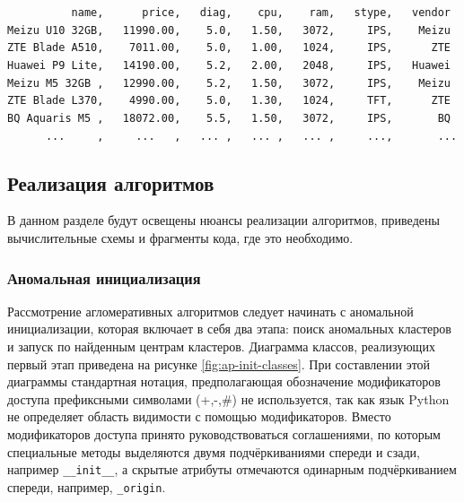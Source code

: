 \documentclass[12pt]{diploma}
\begin{document}
	\begin{tcolorbox}[colframe=black!50!black,coltext=black!25!black,colback=white,title=\textbf{Пример файла входных данных}]
		\verb|          name,      price,   diag,    cpu,    ram,   stype,   vendor |\\
		\verb|Meizu U10 32GB,   11990.00,    5.0,   1.50,   3072,     IPS,    Meizu |\\
		\verb|ZTE Blade A510,    7011.00,    5.0,   1.00,   1024,     IPS,      ZTE |\\
		\verb|Huawei P9 Lite,   14190.00,    5.2,   2.00,   2048,     IPS,   Huawei |\\
		\verb|Meizu M5 32GB ,   12990.00,    5.2,   1.50,   3072,     IPS,    Meizu |\\
		\verb|ZTE Blade L370,    4990.00,    5.0,   1.30,   1024,     TFT,      ZTE |\\
		\verb|BQ Aquaris M5 ,   18072.00,    5.5,   1.50,   3072,     IPS,       BQ |\\
		\verb|      ...     ,     ...   ,   ... ,   ... ,   ... ,     ...,       ... |\\	
	\end{tcolorbox}
	
	\subsection{Реализация алгоритмов}
	В данном разделе будут освещены нюансы реализации алгоритмов, приведены вычислительные схемы и фрагменты кода, где это необходимо.


	\subsubsection{Аномальная инициализация}
	Рассмотрение агломеративных алгоритмов следует начинать с аномальной инициализации, которая включает в себя два этапа: поиск аномальных кластеров и запуск \kmeans по найденным центрам кластеров. Диаграмма классов, реализующих первый  этап приведена на рисунке \ref{fig:ap-init-classes}. При составлении этой диаграммы стандартная нотация, предполагающая обозначение модификаторов доступа префиксными символами \mbox{(+,-,\#)} не используется, так как язык Python не определяет область видимости с помощью модификаторов. Вместо модификаторов доступа принято руководствоваться соглашениями, по которым специальные методы выделяются двумя подчёркиваниями спереди и сзади, например \texttt{\_\_init\_\_}, а скрытые атрибуты отмечаются одинарным подчёркиванием спереди, например, \texttt{\_origin}.
	
\end{document}
